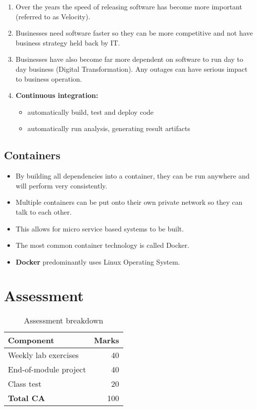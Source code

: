 \documentclass[slides]{pgnotes}
\begin{document}
\begin{enumerate}
\item Over the years the speed of releasing software has become more important (referred to as Velocity).
\item Businesses need software faster so they can be more competitive and not have business strategy held back by IT.
\item Businesses have also become far more dependent on software to run day to day business (Digital Transformation).  Any outages can have serious impact to business operation.
\item \textbf{Continuous integration:}
  \begin{itemize}
  \item automatically build, test and deploy code
  \item automatically run analysis, generating result artifacts
  \end{itemize}
\end{enumerate}


\subsection{Containers}

\begin{itemize}
\item By building all dependencies into a container, they can be run anywhere and will perform very consistently.
\item Multiple containers can be put onto their own private network so they can talk to each other.
\item This allows for micro service based systems to be built.
\item The most common container technology is called Docker.
\item \textbf{Docker} predominantly uses Linux Operating System.
\end{itemize}

\section{Assessment}

\vspace{\fill}

\begin{table}[hb]
  \caption{Assessment breakdown}
  \label{tab:assessment-breakdown}
  \begin{tabularx}{1.0\linewidth}{X r}
    \toprule
    \textbf{Component} & \textbf{Marks} \\
    \midrule
    Weekly lab exercises & 40 \\
    End-of-module project & 40 \\
    Class test & 20 \\
    \midrule
    \textbf{Total CA} & 100 \\
    \bottomrule
  \end{tabularx}
\end{table}
\end{document}
